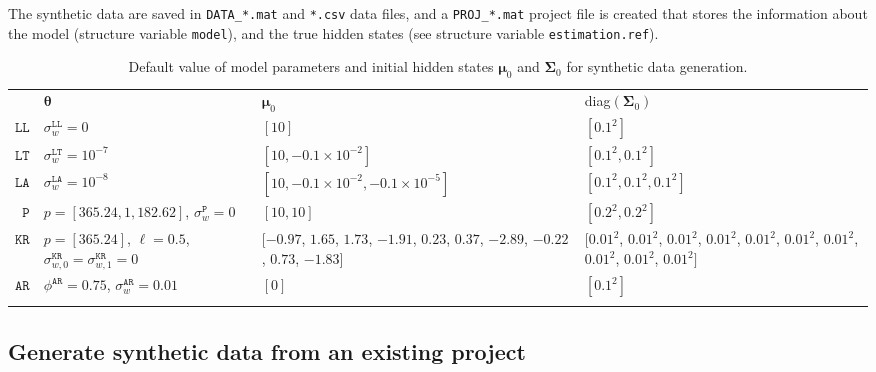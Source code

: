 The synthetic data are saved in \lstinline[basicstyle = \mlttfamily \small, backgroundcolor = \color{light-gray}]!DATA_*.mat! and \lstinline[basicstyle = \mlttfamily \small, backgroundcolor = \color{light-gray}]!*.csv! data files, and a \lstinline[basicstyle = \mlttfamily \small, backgroundcolor = \color{light-gray}]!PROJ_*.mat! project file is created that stores the information about the model (structure variable \lstinline[basicstyle = \mlttfamily \small, backgroundcolor = \color{light-gray}]!model!), and the true hidden states (see structure variable \lstinline[basicstyle = \mlttfamily \small, backgroundcolor = \color{light-gray}]!estimation.ref!).





\begin{table}[h]
     \caption{Default value of model parameters and initial hidden states $\bm{\mu}_{0}$ and $\mathbf{\Sigma}_{0}$ for synthetic data generation.} 
     \centering
     \begin{tabular}{r|lp{3.1cm}p{4cm}}\thickhline
        & $\bm{\theta}$ & $\bm{\mu}_{0}$ & diag$(\mathbf{\Sigma}_{0})$ \\\cmidrule(lr){1-4}
    $\mathtt{LL}$   &  $\sigma_{w}^{\mathtt{LL}}=0$ &$[10]$ & $[0.1^{2}]$ \\
    $\mathtt{LT}$    & $\sigma_{w}^{\mathtt{LT}}=10^{-7}$ &  $[10, -0.1\times10^{-2}]$ & $[0.1^{2}, 0.1^{2}]$ \\
     $\mathtt{LA}$   & $\sigma_{w}^{\mathtt{LA}}=10^{-8}$  &  $[10, -0.1\times10^{-2} , -0.1\times10^{-5}]$ & $[0.1^{2}, 0.1^{2}, 0.1^{2}]$ \\
     $\mathtt{P}$  &  $p=[365.24, 1, 182.62] $, $\sigma_{w}^{\mathtt{P}}=0$  &$[10, 10]$ & $[0.2^{2}, 0.2^{2}]$  \\
     $\mathtt{KR}$  & $p=[365.24]$, $\ell=0.5$, $\sigma_{w,0}^{\mathtt{KR}}=\sigma_{w,1}^{\mathtt{KR}}=0$ &  $[$$-0.97$, $1.65$, $1.73$, $-1.91$, $0.23$, $0.37$, $-2.89$, $-0.22$, $0.73$, $-1.83$$]$ & $[$$0.01^{2}$, $0.01^{2}$, $0.01^{2}$, $0.01^{2}$, $0.01^{2}$, $0.01^{2}$, $0.01^{2}$, $0.01^{2}$, $0.01^{2}$, $0.01^{2}$$]$  \\  
         $\mathtt{AR}$   &  $\phi^{\mathtt{AR}}=0.75$, $\sigma_{w}^{\mathtt{AR}}=0.01$  &$[0]$ & $[0.1^{2}]$ \\\thickhline
     \end{tabular}
\label{table:defaultsynthetic}
\end{table}

\subsection{Generate synthetic data from an existing project}



